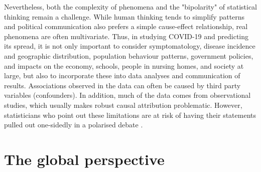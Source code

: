 \documentclass[article]{jdssv}\usepackage[]{graphicx}\usepackage[]{color}
\begin{document}
Nevertheless, both the complexity of phenomena and the "bipolarity" of statistical thinking remain a challenge. While human thinking tends to simplify patterns and political communication also prefers a simple cause-effect relationship, real phenomena are often multivariate. Thus, in studying COVID-19 and predicting its spread, it is not only important to consider symptomatology, disease incidence and geographic distribution, population behaviour patterns, government policies, and impacts on the economy, schools, people in nursing homes, and society at large, but also to incorporate these into data analyses and communication of results. Associations observed in the data can often be caused by third party variables (confounders). In addition, much of the data comes from observational studies, which usually makes robust causal attribution problematic. However, statisticians who point out these limitations are at risk of having their statements pulled out one-sidedly in a polarised debate \citep{McConway2021}.

\section{The global perspective}
\end{document}
